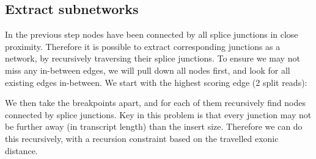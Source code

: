 \documentclass{article}
\theoremstyle{definition}
\begin{document}
\clearpage

\subsection{Extract subnetworks}
In the previous step nodes have been connected by all splice junctions in close proximity.
Therefore it is possible to extract corresponding junctions as a network, by recursively traversing their splice junctions.
To ensure we may not miss any in-between edges, we will pull down all nodes first, and look for all existing edges in-between.
We start with the highest scoring edge (2 split reads):



\noindent We then take the breakpoints apart, and for each of them recursively find nodes connected by splice junctions.
Key in this problem is that every junction may not be further away (in transcript length) than the insert size.
Therefore we can do this recursively, with a recursion constraint based on the travelled exonic distance.
\end{document}
